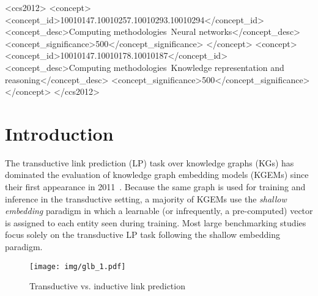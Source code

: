 \documentclass[sigconf,screen]{acmart}
\begin{document}
\begin{CCSXML}
<ccs2012>
<concept>
<concept_id>10010147.10010257.10010293.10010294</concept_id>
<concept_desc>Computing methodologies~Neural networks</concept_desc>
<concept_significance>500</concept_significance>
</concept>
<concept>
<concept_id>10010147.10010178.10010187</concept_id>
<concept_desc>Computing methodologies~Knowledge representation and reasoning</concept_desc>
<concept_significance>500</concept_significance>
</concept>
</ccs2012>
\end{CCSXML}





\maketitle

\section{Introduction}

The transductive link prediction (LP) task over knowledge graphs (KGs) has dominated the evaluation of knowledge graph embedding models (KGEMs) since their first appearance in 2011~\cite{DBLP:conf/icml/NickelTK11}.
Because the same graph is used for training and inference in the transductive setting, a majority of KGEMs use the \emph{shallow embedding} paradigm in which a learnable (or infrequently, a pre-computed) vector is assigned to each entity seen during training.
Most large benchmarking studies~\cite{ali2020benchmarking, Ruffinelli2020You, hu2020open} focus solely on the transductive LP task following the shallow embedding paradigm.

\begin{figure}[t]
    \centering
    \texttt{[image: img/glb\_1.pdf]}
    \caption{Transductive vs. inductive link prediction}
    \label{fig:inductive_lp1}
\end{figure}
\end{document}
